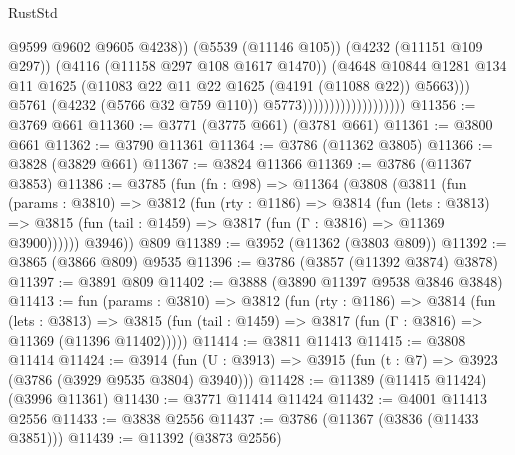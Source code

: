 \begin{lexlean}{RustStd}
\begin{coremodule}
                                                @9599
                                                @9602
                                                @9605
                                                @4238))
                                            (@5539 (@11146 @105))
                                            (@4232 (@11151 @109 @297))
                                            (@4116 (@11158 @297 @108 @1617 @1470))
                                            (@4648
                                              @10844
                                              @1281
                                              @134
                                              @11
                                              @1625
                                              (@11083
                                                @22
                                                @11
                                                @22
                                                @1625
                                                (@4191 (@11088 @22))
                                                @5663)))
                                          @5761
                                          (@4232 (@5766 @32 @759 @110))
                                          @5773)))))))))))))))))))
@11356 := @3769 @661
@11360 := @3771 (@3775 @661) (@3781 @661)
@11361 := @3800 @661
@11362 := @3790 @11361
@11364 := @3786 (@11362 @3805)
@11366 := @3828 (@3829 @661)
@11367 := @3824 @11366
@11369 := @3786 (@11367 @3853)
@11386 := @3785
    (fun (fn : @98) =>
    @11364
      (@3808
        (@3811
          (fun (params : @3810) =>
          @3812
            (fun (rty : @1186) =>
            @3814
              (fun (lets : @3813) =>
              @3815 (fun (tail : @1459) => @3817 (fun (Γ : @3816) => @11369 @3900))))))
        @3946))
    @809
@11389 := @3952 (@11362 (@3803 @809))
@11392 := @3865 (@3866 @809) @9535
@11396 := @3786 (@3857 (@11392 @3874) @3878)
@11397 := @3891 @809
@11402 := @3888 (@3890 @11397 @9538 @3846 @3848)
@11413 := fun (params : @3810) =>
  @3812
    (fun (rty : @1186) =>
    @3814
      (fun (lets : @3813) =>
      @3815 (fun (tail : @1459) => @3817 (fun (Γ : @3816) => @11369 (@11396 @11402)))))
@11414 := @3811 @11413
@11415 := @3808 @11414
@11424 := @3914 (fun (U : @3913) => @3915 (fun (t : @7) => @3923 (@3786 (@3929 @9535 @3804) @3940)))
@11428 := @11389 (@11415 @11424) (@3996 @11361)
@11430 := @3771 @11414 @11424
@11432 := @4001 @11413 @2556
@11433 := @3838 @2556
@11437 := @3786 (@11367 (@3836 (@11433 @3851)))
@11439 := @11392 (@3873 @2556)

\end{coremodule}
\end{lexlean}
